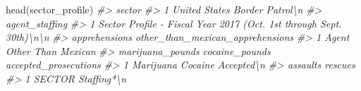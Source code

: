 \documentclass[
]{krantz}
\makeatletter
\newenvironment{Shaded}{\begin{snugshade}}{\end{snugshade}}
\newcommand{\CommentTok}[1]{\textcolor[rgb]{0.37,0.37,0.37}{\textit{#1}}}
\newcommand{\FunctionTok}[1]{\textcolor[rgb]{0,0,0}{#1}}
\newcommand{\NormalTok}[1]{#1}
\newenvironment{kframe}{%
\medskip{}
\setlength{\fboxsep}{.8em}
 \def\at@end@of@kframe{}%
 \ifinner\ifhmode%
  \def\at@end@of@kframe{\end{minipage}}%
  \begin{minipage}{\columnwidth}%
 \fi\fi%
 \def\FrameCommand##1{\hskip\@totalleftmargin \hskip-\fboxsep
 \colorbox{shadecolor}{##1}\hskip-\fboxsep
     \hskip-\linewidth \hskip-\@totalleftmargin \hskip\columnwidth}%
 \MakeFramed {\advance\hsize-\width
   \@totalleftmargin\z@ \linewidth\hsize
   \@setminipage}}%
 {\par\unskip\endMakeFramed%
 \at@end@of@kframe}
\renewenvironment{Shaded}{\begin{kframe}}{\end{kframe}}
\makeatother
\begin{document}
\begin{Shaded}
\begin{Highlighting}[]
\FunctionTok{head}\NormalTok{(sector\_profile)}
\CommentTok{\#\textgreater{}                          sector}
\CommentTok{\#\textgreater{} 1 United States Border Patrol\textbackslash{}n}
\CommentTok{\#\textgreater{}                                                        agent\_staffing}
\CommentTok{\#\textgreater{} 1 Sector Profile {-} Fiscal Year 2017 (Oct. 1st through Sept. 30th)\textbackslash{}n\textbackslash{}n}
\CommentTok{\#\textgreater{}   apprehensions other\_than\_mexican\_apprehensions}
\CommentTok{\#\textgreater{} 1         Agent               Other Than Mexican}
\CommentTok{\#\textgreater{}   marijuana\_pounds cocaine\_pounds accepted\_prosecutions}
\CommentTok{\#\textgreater{} 1        Marijuana        Cocaine            Accepted\textbackslash{}n}
\CommentTok{\#\textgreater{}   assaults     rescues}
\CommentTok{\#\textgreater{} 1   SECTOR Staffing*\textbackslash{}n}

\end{Highlighting}
\end{Shaded}
\end{document}
